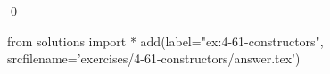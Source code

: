 
\begin{ex}
  \label{ex:4-61-constructors}
  
  \qed
\end{ex}
\begin{python0}
from solutions import *
add(label="ex:4-61-constructors",
    srcfilename='exercises/4-61-constructors/answer.tex')
\end{python0}
